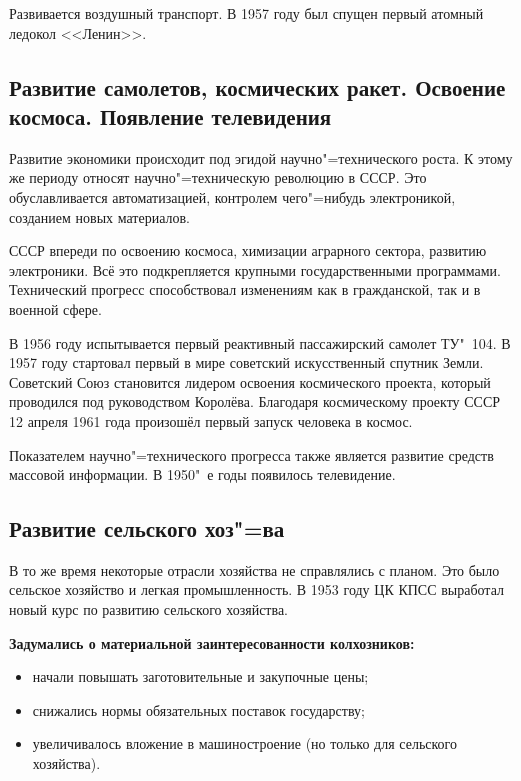 Развивается воздушный транспорт. В 1957 году был спущен первый атомный ледокол <<Ленин>>.

\subsection{Развитие самолетов, космических ракет. Освоение космоса. Появление телевидения}

Развитие экономики происходит под эгидой научно"=технического роста. К этому же периоду относят научно"=техническую революцию в СССР. Это обуславливается автоматизацией, контролем чего"=нибудь электроникой, созданием новых материалов. 

СССР впереди по освоению космоса, химизации аграрного сектора, развитию электроники. Всё это подкрепляется крупными государственными программами. Технический прогресс способствовал изменениям как в гражданской, так и в военной сфере. 

В 1956 году испытывается первый реактивный пассажирский самолет ТУ"~104. В 1957 году стартовал первый в мире советский искусственный спутник Земли. Советский Союз становится лидером освоения космического проекта, который проводился под руководством Королёва. Благодаря космическому проекту СССР 12 апреля 1961 года произошёл первый запуск человека в космос.

Показателем научно"=технического прогресса также является развитие средств массовой информации. В 1950"~е годы появилось телевидение. 

\subsection{Развитие сельского хоз"=ва}

В то же время некоторые отрасли хозяйства не справлялись с планом. Это было сельское хозяйство и легкая промышленность. В 1953 году ЦК КПСС выработал новый курс по развитию сельского хозяйства. 

\textbf{Задумались о материальной заинтересованности колхозников:} 

\begin{itemize}
    \item начали повышать заготовительные и закупочные цены;
    \item снижались нормы обязательных поставок государству;
    \item увеличивалось вложение в машиностроение (но только для сельского хозяйства).
\end{itemize}

